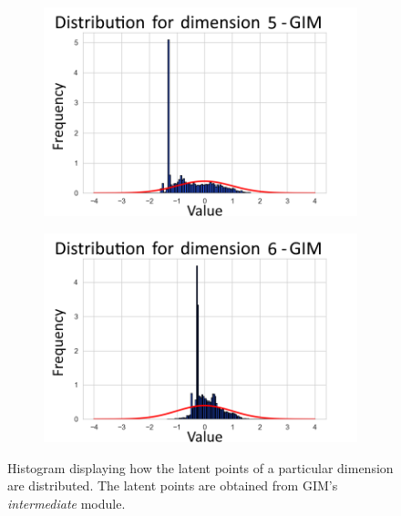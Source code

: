 \begin{figure}[h]
\begin{subfigure}[b]{0.25\textwidth}
	\end{subfigure}
	\hfill
	\begin{subfigure}[b]{0.25\textwidth}
		\centering
		\includegraphics[width=1\linewidth]{"graphs/distr/module1 kld0/_ distribution_latent_space_GIM_dim=4"}
	\end{subfigure}
	\hfill
	\begin{subfigure}[b]{0.25\textwidth}
		\centering
		\includegraphics[width=1\linewidth]{"graphs/distr/module1 kld0/_ distribution_latent_space_GIM_dim=5"}
	\end{subfigure}
	\caption{Histogram displaying how the latent points of a particular dimension are distributed. The latent points are obtained from GIM's \textit{intermediate} module.}
	\label{fig:distr_module1_beta0}
\end{figure}
